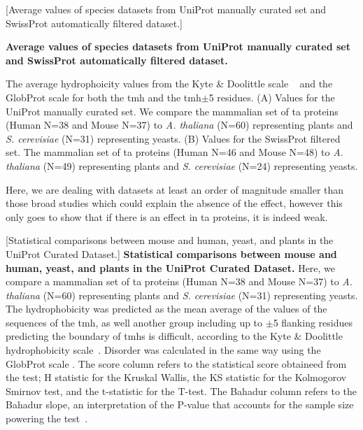 \begin{table}[]
\centering
{}[Average values of species datasets from UniProt manually curated set and SwissProt automatically filtered dataset.]
{\textbf{Average values of species datasets from UniProt manually curated set and SwissProt automatically filtered dataset.}

The average hydrophoicity values from the Kyte \& Doolittle scale ~\cite{Kyte1982} and the GlobProt scale \cite{Linding2003} for both the \gls{tmh} and the \gls{tmh}$\pm$5 residues.
(A) Values for the UniProt manually curated set. We compare the mammalian set of \gls{ta} proteins (Human N=38 and Mouse N=37) to \textit{A. thaliana} (N=60) representing plants  and  \textit{S. cerevisiae} (N=31) representing yeasts.
(B) Values for the SwissProt filtered set. The mammalian set of \gls{ta} proteins (Human N=46 and Mouse N=48) to \textit{A. thaliana} (N=49) representing plants  and  \textit{S. cerevisiae} (N=24) representing yeasts.
}
\label{average_species_ta}
\end{table}

Here, we are dealing with datasets at least an order of magnitude smaller than those broad studies which could explain the absence of the effect, however this only goes to show that if there is an effect in \gls{ta} proteins, it is indeed weak.

\begin{table}[htbp]

\centering

[Statistical comparisons between mouse and human, yeast, and plants in the UniProt Curated Dataset.]
{\textbf{Statistical comparisons between mouse and human, yeast, and plants in the UniProt Curated Dataset.}
Here, we compare a mammalian set of \gls{ta} proteins (Human N=38 and Mouse N=37) to \textit{A. thaliana} (N=60) representing plants  and  \textit{S. cerevisiae} (N=31) representing yeasts.
The hydrophobicity was predicted as the mean average of the values of the sequences of the \gls{tmh}, as well another group including up to $\pm$5 flanking residues predicting the boundary of \gls{tmh}s is difficult, according to the Kyte \& Doolittle hydrophobicity scale~\cite{Kyte1982}.
Disorder was calculated in the same way using the GlobProt scale \cite{Linding2003}.
The score column refers to the statistical score obtaineed from the test; H statistic for the Kruskal Wallis, the KS statistic for the Kolmogorov Smirnov test, and the t-statistic for the T-test.
The Bahadur column refers to the Bahadur slope, an interpretation of the P-value that accounts for the sample size powering the test~\cite{Bahadur1967, Bahadur1971}.}


	\label{table:speciestableuniprotstats}
\end{table}%

